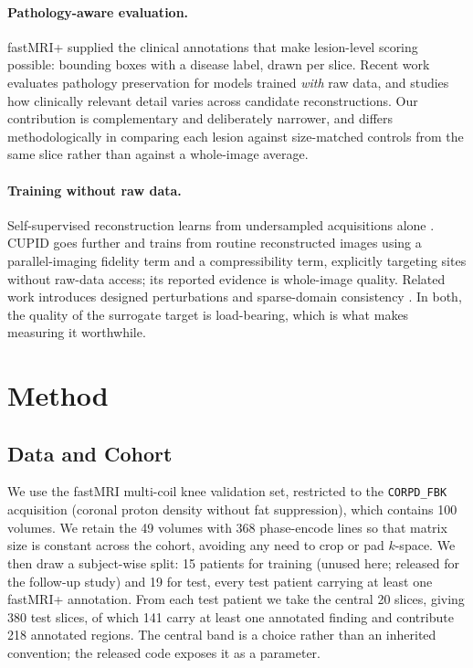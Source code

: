 \documentclass[letterpaper]{article} %
\begin{document}
\paragraph{Pathology-aware evaluation.}
fastMRI+ \citep{zhao2021fastmriplus} supplied the clinical annotations that make
lesion-level scoring possible: bounding boxes with a disease label, drawn per
slice. Recent work evaluates pathology preservation for models trained
\emph{with} raw data, and studies how clinically relevant detail varies across
candidate reconstructions. Our contribution is complementary and deliberately
narrower, and differs methodologically in comparing each lesion against
size-matched controls from the same slice rather than against a whole-image
average.

\paragraph{Training without raw data.}
Self-supervised reconstruction learns from undersampled acquisitions alone
\citep{yaman2020ssdu}. CUPID \citep{alcalar2025cupid} goes further and trains
from routine reconstructed images using a parallel-imaging fidelity term and a
compressibility term, explicitly targeting sites without raw-data access; its
reported evidence is whole-image quality. Related work introduces designed
perturbations and sparse-domain consistency \citep{alcalar2025spic}. In both,
the quality of the surrogate target is load-bearing, which is what makes
measuring it worthwhile.

\section{Method}

\subsection{Data and Cohort}
We use the fastMRI multi-coil knee validation set, restricted to the
\texttt{CORPD\_FBK} acquisition (coronal proton density without fat
suppression), which contains 100 volumes. We retain the 49 volumes with 368
phase-encode lines so that matrix size is constant across the cohort, avoiding
any need to crop or pad $k$-space. We then draw a subject-wise split: 15
patients for training (unused here; released for the follow-up study) and 19 for
test, every test patient carrying at least one fastMRI+ annotation. From each
test patient we take the central 20 slices, giving 380 test slices, of which 141
carry at least one annotated finding and contribute 218 annotated regions. The
central band is a choice rather than an inherited convention; the released code
exposes it as a parameter.
\end{document}

